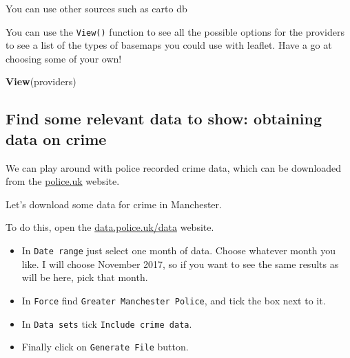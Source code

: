 \documentclass[]{book}
\newenvironment{Shaded}{\begin{snugshade}}{\end{snugshade}}
\newcommand{\CommentTok}[1]{\textcolor[rgb]{0.56,0.35,0.01}{\textit{#1}}}
\newcommand{\DataTypeTok}[1]{\textcolor[rgb]{0.13,0.29,0.53}{#1}}
\newcommand{\DecValTok}[1]{\textcolor[rgb]{0.00,0.00,0.81}{#1}}
\newcommand{\FloatTok}[1]{\textcolor[rgb]{0.00,0.00,0.81}{#1}}
\newcommand{\KeywordTok}[1]{\textcolor[rgb]{0.13,0.29,0.53}{\textbf{#1}}}
\newcommand{\NormalTok}[1]{#1}
\newcommand{\OperatorTok}[1]{\textcolor[rgb]{0.81,0.36,0.00}{\textbf{#1}}}
\newcommand{\StringTok}[1]{\textcolor[rgb]{0.31,0.60,0.02}{#1}}
\providecommand{\tightlist}{%
  \setlength{\itemsep}{0pt}\setlength{\parskip}{0pt}}
\begin{document}
\hypertarget{htmlwidget-7ced443cfcdfcebd2287}{}

You can use other sources such as carto db

\begin{Shaded}
\end{Shaded}

\hypertarget{htmlwidget-f79b896d3a355915d540}{}

You can use the \texttt{View()} function to see all the possible options for the providers to see a list of the types of basemaps you could use with leaflet. Have a go at choosing some of your own!

\begin{Shaded}
\begin{Highlighting}[]
\KeywordTok{View}\NormalTok{(providers)}
\end{Highlighting}
\end{Shaded}

\hypertarget{find-some-relevant-data-to-show-obtaining-data-on-crime}{%
\subsection{Find some relevant data to show: obtaining data on crime}\label{find-some-relevant-data-to-show-obtaining-data-on-crime}}

We can play around with police recorded crime data, which can be downloaded from the \href{https://data.police.uk/data/}{police.uk} website.

Let's download some data for crime in Manchester.

To do this, open the \href{https://data.police.uk/data/}{data.police.uk/data} website.

\begin{itemize}
\tightlist
\item
  In \texttt{Date\ range} just select one month of data. Choose whatever month you like. I will choose November 2017, so if you want to see the same results as will be here, pick that month.
\item
  In \texttt{Force} find \texttt{Greater\ Manchester\ Police}, and tick the box next to it.
\item
  In \texttt{Data\ sets} tick \texttt{Include\ crime\ data}.
\item
  Finally click on \texttt{Generate\ File} button.
\end{itemize}
\end{document}
